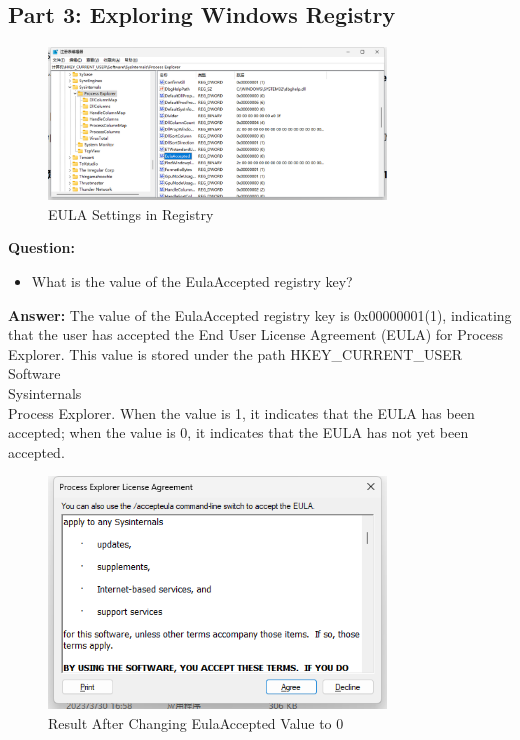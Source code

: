 \documentclass[12pt,a4paper]{article}
\begin{document}
\subsection{Part 3: Exploring Windows Registry}

\begin{figure}[H]
    \centering
    \includegraphics[width=0.8\textwidth]{Eula.png}
    \caption{EULA Settings in Registry}
    \label{fig:eula}
\end{figure}

\textbf{Question:}
\begin{itemize}
    \item What is the value of the EulaAccepted registry key?
\end{itemize}

\textbf{Answer:}
The value of the EulaAccepted registry key is 0x00000001(1), indicating that the user has accepted the End User License Agreement (EULA) for Process Explorer. This value is stored under the path HKEY\_CURRENT\_USER\\Software\\Sysinternals\\Process Explorer. When the value is 1, it indicates that the EULA has been accepted; when the value is 0, it indicates that the EULA has not yet been accepted.

\begin{figure}[H]
    \centering
    \includegraphics[width=0.8\textwidth]{Eula_0_result.png}
    \caption{Result After Changing EulaAccepted Value to 0}
    \label{fig:eula_result}
\end{figure}
\end{document}
